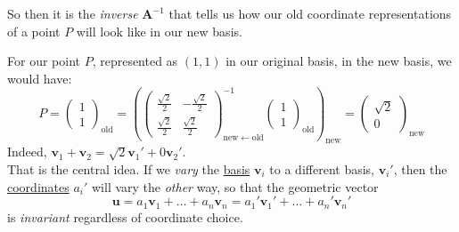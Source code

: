 \documentclass[../master.tex]{subfiles}
\begin{document}
	
	So then it is the \emph{inverse} $\mathbf A^{-1}$ that tells us how our old coordinate representations of a point $P$ will look like in our new basis.
	
	For our point $P$, represented as $(1,1)$ in our original basis, in the new basis, we would have:
	\begin{equation*}
		P = \begin{pmatrix}
			1 \\ 1
		\end{pmatrix}_{\mathrm{old}}
		= \left( \begin{pmatrix}
			 \frac{\sqrt 2}{2} &  -\frac{\sqrt 2}{2} \\
			 \frac{\sqrt 2}{2} &  \frac{\sqrt 2}{2}
		\end{pmatrix}^{-1}_{\mathrm{new} \leftarrow \mathrm{old}} 		\begin{pmatrix}
			1 \\ 1
		\end{pmatrix}_{\mathrm{old}}\right)_\mathrm{new}
		= \begin{pmatrix}
			\sqrt 2 \\ 0
		\end{pmatrix}_{\mathrm{new}}
	\end{equation*}
	Indeed, $\mathbf v_1 + \mathbf v_2 = \sqrt 2 \mathbf v_1' + 0 \mathbf v_2'$.\\
	
	That is the central idea. If we \emph{vary} the \underline{basis} $\mathbf v_i$ to a different basis, $\mathbf v_i'$, then the \underline{coordinates} $a_i'$ will vary  the \emph{other} way, so that the geometric vector
	\begin{equation*}
		\mathbf u = a_1 \mathbf v_1 + \dots + a_n \mathbf v_n = a_1' \mathbf v_1' + \dots + a_n' \mathbf v_n'
	\end{equation*} is \emph{invariant} regardless of coordinate choice.
	
\end{document}
